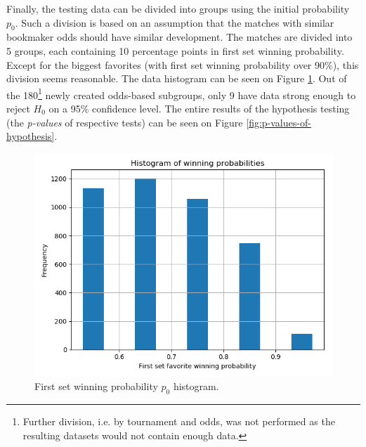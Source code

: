 \documentclass{easychair}
\begin{document}
Finally, the testing data can be divided into groups using the initial
probability $p_{0}$. Such a division is based on an assumption that
the matches with similar bookmaker odds should have similar development.
The matches are divided into 5 groups, each containing 10 percentage
points in first set winning probability. Except for the biggest favorites
(with first set winning probability over 90\%), this division seems
reasonable. The data histogram can be seen on Figure \ref{fig:First-set-winning}.
Out of the 180\footnote{Further division, i.e. by tournament and odds, was not performed as
the resulting datasets would not contain enough data.} newly created odds-based subgroups, only 9 have data strong enough
to reject $H_{0}$ on a 95\% confidence level. The entire results
of the hypothesis testing (the \emph{p-values }of respective tests)
can be seen on Figure \ref{fig:p-values-of-hypothesis}.

\begin{figure}

\begin{centering}
\includegraphics[width=1\textwidth]{probabilities_histogram}\caption{\label{fig:First-set-winning}First set winning probability $p_{0}$
histogram.}
\par\end{centering}
\end{figure}
\end{document}
